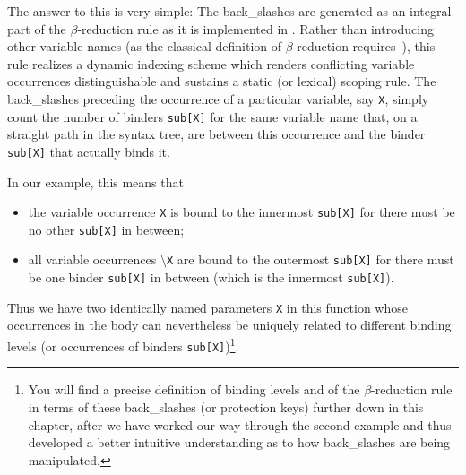 The answer to this is very simple: The back\_slashes are
generated as an integral part of the {\mys  $\beta$-reduction rule}
 as it is implemented in \pired.
Rather than introducing other variable names (as the
classical definition of $\beta$-reduction requires~\cite{bar81,hind86}), this rule
realizes a {\mys dynamic indexing scheme} which renders conflicting
variable occurrences distinguishable and sustains a {\mys static} (or lexical)
{\mys scoping rule}.
The back\_slashes preceding the occurrence of a particular variable,
 say {\tt X}, 
simply  count the number of {\mys binders} {\tt sub[X]} for the same
variable name that, on a straight path in the syntax tree, are between this
occurrence and the binder {\tt sub[X]} that actually binds it.

In our example, this means that
\begin{itemize}
\item the variable occurrence {\tt X} is bound to the innermost {\tt sub[X]}
for there must be no other {\tt sub[X]} in between;
\item all variable occurrences {\tt $\setminus$X} are bound to
 the outermost {\tt sub[X]}
for there must be one binder {\tt sub[X]} in between (which is the
innermost {\tt sub[X]}).
\end{itemize}
Thus we have two identically named parameters {\tt X} in this function whose
occurrences in the body can nevertheless be uniquely related
 to different {\mys binding levels} (or occurrences of binders {\tt sub[X]})\footnote{You will find  a precise definition of binding levels and of 
the $\beta$-reduction rule in terms of these back\_slashes (or 
{\mys protection keys}) further down in this chapter, after we have worked
our way through the second example and thus developed a better
intuitive understanding as to how back\_slashes are being manipulated.}.
	
